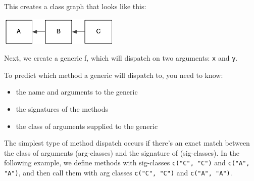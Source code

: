 This creates a class graph that looks like this:

\includegraphics{diagrams/class-graph-1.png}

Next, we create a generic f, which will dispatch on two arguments:
\texttt{x} and \texttt{y}.

\begin{Shaded}
\begin{Highlighting}[]
\NormalTok{(}\NormalTok{(}\NormalTok{))}
\end{Highlighting}
\end{Shaded}

To predict which method a generic will dispatch to, you need to know:

\begin{itemize}
\itemsep1pt\parskip0pt
\item
  the name and arguments to the generic
\item
  the signatures of the methods
\item
  the class of arguments supplied to the generic
\end{itemize}

The simplest type of method dispatch occurs if there's an exact match
between the class of arguments (arg-classes) and the signature of
(sig-classes). In the following example, we define methods with
sig-classes \texttt{c("C", "C")} and \texttt{c("A", "A")}, and then call
them with arg classes \texttt{c("C", "C")} and \texttt{c("A", "A")}.

\begin{Shaded}
\begin{Highlighting}[]
\NormalTok{(}\NormalTok{, }\NormalTok{(}\NormalTok{, }\NormalTok{)}
\NormalTok{(}\NormalTok{, }\NormalTok{(}\NormalTok{, }\NormalTok{)}

\end{Highlighting}
\end{Shaded}


